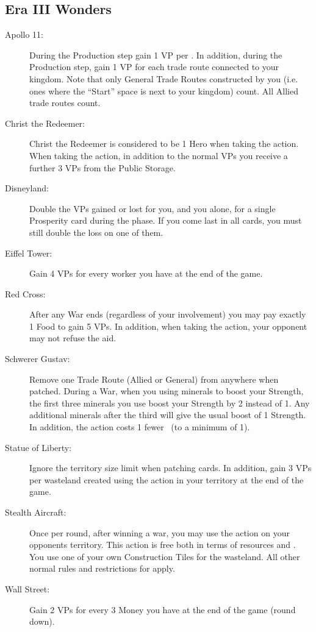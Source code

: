 \documentclass[10pt,twocolumn]{article}
\begin{document}
\begin{appendices}
\subsection{Era III Wonders}
\begin{description}
\item[Apollo 11:] During the Production step gain 1 VP per \tra. In addition, during the Production step, gain 1 VP for each trade route connected to your kingdom. Note that only General Trade Routes constructed by you (i.e. ones where the ``Start'' space is next to your kingdom) count. All Allied trade routes count.
\item[Christ the Redeemer:] Christ the Redeemer is considered to be 1 Hero when taking the  action. When taking the  action, in addition to the normal VPs you receive a further 3 VPs from the Public Storage.
\item[Disneyland:] Double the VPs gained or lost for you, and you alone, for a single Prosperity card during the  phase. If you come last in all cards, you must still double the loss on one of them.
\item[Eiffel Tower:] Gain 4 VPs for every worker you have at the end of the game.
\item[Red Cross:] After any War ends (regardless of your involvement) you may pay exactly 1 Food to gain 5 VPs. In addition, when taking the  action, your opponent may not refuse the aid.
\item[Schwerer Gustav:] Remove one Trade Route (Allied or General) from anywhere when patched. During a War, when you using minerals to boost your Strength, the first three minerals you use boost your Strength by 2 instead of 1. Any additional minerals after the third will give the usual boost of 1 Strength. In addition, the  action costs 1 fewer \polf\ (to a minimum of 1).
\item[Statue of Liberty:] Ignore the territory size limit when patching cards. In addition, gain 3 VPs per wasteland created using the  action in your territory at the end of the game.
\item[Stealth Aircraft:] Once per round, after winning a war, you may use the  action on your opponents territory. This action is free both in terms of resources and \polf. You use one of your own Construction Tiles for the wasteland. All other normal rules and restrictions for  apply.
\item[Wall Street:] Gain 2 VPs for every 3 Money you have at the end of the game (round down).
\end{description}

\end{appendices}
\end{document}
